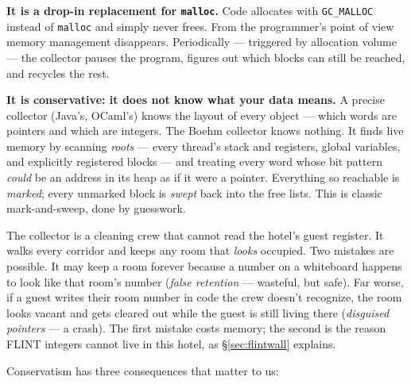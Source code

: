 \documentclass[11pt,oneside]{report}
\newcommand{\code}[1]{\textcolor{m2code}{\texttt{#1}}}
\begin{document}
\textbf{It is a drop-in replacement for \code{malloc}.} Code allocates with
\code{GC\_MALLOC} instead of \code{malloc} and simply never frees. From the
programmer's point of view memory management disappears. Periodically ---
triggered by allocation volume --- the collector pauses the program, figures
out which blocks can still be reached, and recycles the rest.

\textbf{It is conservative: it does not know what your data means.}
A precise collector (Java's, OCaml's) knows the layout of every object ---
which words are pointers and which are integers. The Boehm collector knows
nothing. It finds live memory by scanning \emph{roots} --- every thread's
stack and registers, global variables, and explicitly registered blocks ---
and treating every word whose bit pattern \emph{could} be an address in its
heap as if it were a pointer. Everything so reachable is \emph{marked}; every
unmarked block is \emph{swept} back into the free lists. This is classic
mark-and-sweep, done by guesswork.

\begin{plainterms}
The collector is a cleaning crew that cannot read the hotel's guest register.
It walks every corridor and keeps any room that \emph{looks} occupied.
Two mistakes are possible. It may keep a room forever because a number on a
whiteboard happens to look like that room's number (\emph{false retention} ---
wasteful, but safe). Far worse, if a guest writes their room number in code
the crew doesn't recognize, the room looks vacant and gets cleared out while
the guest is still living there (\emph{disguised pointers} --- a crash). The
first mistake costs memory; the second is the reason FLINT integers cannot
live in this hotel, as \S\ref{sec:flintwall} explains.
\end{plainterms}

Conservatism has three consequences that matter to us:
\end{document}
